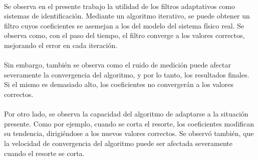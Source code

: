 \paragraph{}
Se observa en el presente trabajo la utilidad de los filtros adaptativos como sistemas de identificación. Mediante un algoritmo iterativo, se puede obtener un filtro cuyos coeficientes se asemejan a los del modelo del sistema físico real. Se observa como, con el paso del tiempo, el filtro converge a los valores correctos, mejorando el error en cada iteración.
\paragraph{}
Sin embargo, también se observa como el ruido de medición puede afectar severamente la convergencia del algoritmo, y por lo tanto, los resultados finales. Si el mismo es demasiado alto, los coeficientes no convergerán a los valores correctos.
\paragraph{}
Por otro lado, se observa la capacidad del algoritmo de adaptarse a la situación presente. Como por ejemplo, cuando se corta el resorte, los coeficientes modifican su tendencia, dirigiéndose a los nuevos valores correctos. Se observó también, que la velocidad de convergencia del algoritmo puede ser afectada severamente cuando el resorte se corta.

